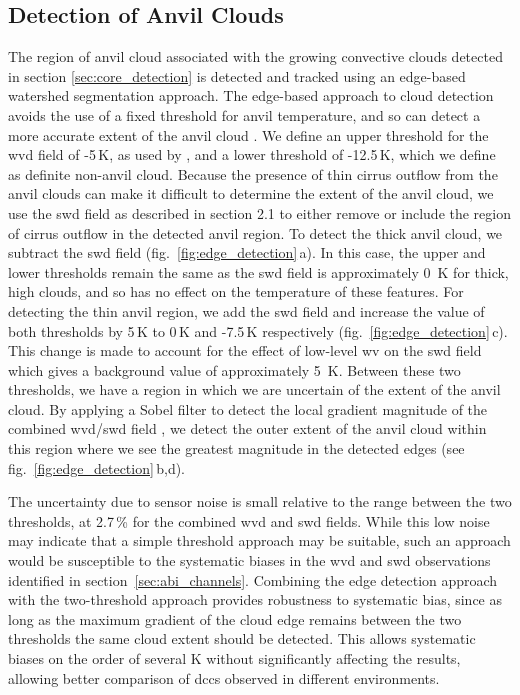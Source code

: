 \subsection{Detection of Anvil Clouds} \label{sec:anvil_detection}

The region of anvil cloud associated with the growing convective clouds detected in section \ref{sec:core_detection} is detected and tracked using an edge-based watershed segmentation approach.
The edge-based approach to cloud detection avoids the use of a fixed threshold for anvil temperature, and so can detect a more accurate extent of the anvil cloud \citep{dim_alternative_2013}.
We define an upper threshold for the \acrshort{wvd} field of -5\,\unit{K}, as used by \citet{muller_role_2018}, and a lower threshold of -12.5\,\unit{K}, which we define as definite non-anvil cloud.
Because the presence of thin cirrus outflow from the anvil clouds can make it difficult to determine the extent of the anvil cloud, we use the \acrshort{swd} field as described in section 2.1 to either remove or include the region of cirrus outflow in the detected anvil region.
To detect the thick anvil cloud, we subtract the \acrshort{swd} field (fig.~\ref{fig:edge_detection}\,a).
In this case, the upper and lower thresholds remain the same as the \acrshort{swd} field is approximately 0~K for thick, high clouds, and so has no effect on the temperature of these features.
For detecting the thin anvil region, we add the \acrshort{swd} field and increase the value of both thresholds by 5\,\unit{K} to 0\,\unit{K} and -7.5\,\unit{K} respectively (fig.~\ref{fig:edge_detection}\,c).
This change is made to account for the effect of low-level \acrshort{wv} on the \acrshort{swd} field which gives a background value of approximately 5~K.
Between these two thresholds, we have a region in which we are uncertain of the extent of the anvil cloud.
By applying a Sobel filter to detect the local gradient magnitude of the combined \acrshort{wvd}/\acrshort{swd} field \citep{sobel_isotropic_2014}, we detect the outer extent of the anvil cloud within this region where we see the greatest magnitude in the detected edges (see fig.~\ref{fig:edge_detection}\,b,d).

The uncertainty due to sensor noise is small relative to the range between the two thresholds, at 2.7\,\% for the combined \acrshort{wvd} and \acrshort{swd} fields.
While this low noise may indicate that a simple threshold approach may be suitable, such an approach would be susceptible to the systematic biases in the \acrshort{wvd} and \acrshort{swd} observations identified in section~\ref{sec:abi_channels}.
Combining the edge detection approach with the two-threshold approach provides robustness to systematic bias, since as long as the maximum gradient of the cloud edge remains between the two thresholds the same cloud extent should be detected.
This allows systematic biases on the order of several K without significantly affecting the results, allowing better comparison of \acrshort{dcc}s observed in different environments.


